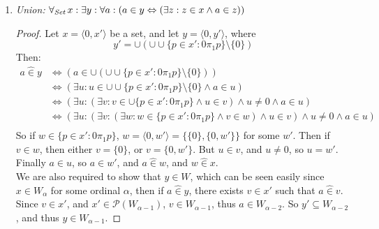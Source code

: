 \documentclass[11pt]{report}
\newcommand{\all}[1]{\forall_{\mathit{#1}}\hspace{0.5mm}}
\newcommand{\pleft}{\mathrel{\pi_1}}
\newcommand{\pright}{\mathrel{\pi_2}}
\newcommand{\pair}[2]{\langle #1,#2 \rangle}
\newcommand{\zin}{\mathrel{\widehat{\in}}}
\newcommand{\zpright}{\mathrel{\widehat{\pi}_2}}
\newcommand{\zpleft}{\mathrel{\widehat{\pi}_1}}
\theoremstyle{definition}
\theoremstyle{theorem}
\theoremstyle{lemma}
\begin{document}
\begin{enumerate}[resume=axiomlist, label=\Roman*.]
  \begin{enumerate}[resume=sublist,label=(\roman*)]
    \item \textit{Pairs:}
    $\forall a,b: (\exists p: a\pleft p \wedge b\pright p)$
  \end{enumerate}
  \begin{proof}
  Let $a,b$ be any objects, then $a,b\in W_\alpha$ for some ordinal $\alpha$.
  Now let $p = \pair{1}{p'}$ where $p'=\pair{a}{b} \in W_\alpha^2$, and so $p\in W_{\alpha+1}$, and $a\zpleft p$, $b\zpright p$.
  \end{proof}

\item \textit{Union:}
      $\all{Set} x: \exists y: \forall a: (a\in y \Leftrightarrow (\exists z: z\in x \wedge a\in z))$
\begin{proof}
  Let $x=\pair{0}{x'}$ be a set, and let $y=\pair{0}{y'}$, where $$y'=\cup(\cup\cup \{p\in x' : 0\pleft p\} \setminus \{0\})$$
  Then:
  \begin{align*}
    a\zin y &\iff (a\in \cup(\cup\cup \{p\in x' : 0\pleft p\} \setminus \{0\})) \\
    &\iff (\exists u: u\in \cup\cup \{p\in x' : 0\pleft p\} \setminus \{0\} \wedge a\in u) \\
    &\iff (\exists u: (\exists v: v \in \cup \{p\in x' : 0\pleft p\} \wedge u \in v) \wedge u \neq 0 \wedge a\in u) \\
    &\iff (\exists u: (\exists v: (\exists w: w\in\{p\in x' : 0\pleft p\}\wedge v \in w) \wedge u \in v) \wedge u \neq 0 \wedge a\in u)\\
  \end{align*}
  So if $w\in\{p\in x' : 0\pleft p\}$, $w=\pair{0}{w'}=\{\{0\},\{0,w'\}\}$ for some $w'$.
  Then if $v\in w$, then either $v=\{0\}$, or $v=\{0,w'\}$.
  But $u\in v$, and $u\neq 0$, so $u=w'$.
  Finally $a\in u$, so $a\in w'$, and $a \zin w$, and $w \zin x$.\\

  We are also required to show that $y\in W$, which can be seen easily since $x\in W_\alpha$ for some ordinal $\alpha$, then if $a\zin y$, there exists $v\in x'$ such that $a\zin v$.
  Since $v\in x'$, and $x'\in\mathcal{P}(W_{\alpha-1})$, $v\in W_{\alpha-1}$, thus $a\in W_{\alpha-2}$.
  So $y'\subseteq W_{\alpha-2}$, and thus $y \in W_{\alpha-1}$.
\end{proof}


\end{enumerate}
\end{document}
